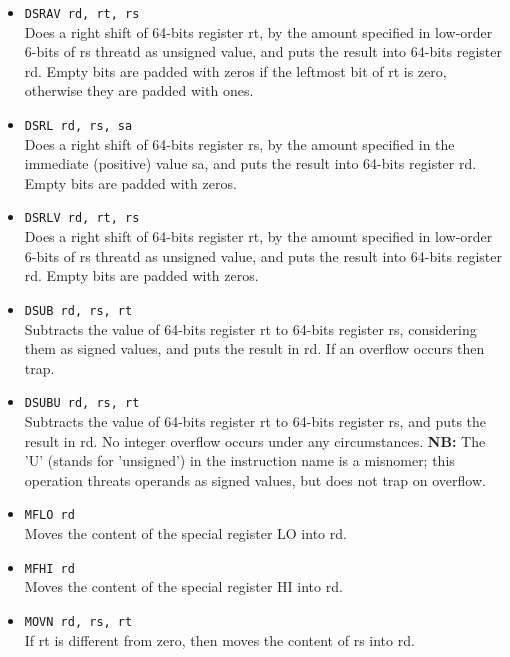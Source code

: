 \documentclass[12pt]{report}
\newcommand{\MISN}{\textbf{NB:} The 'U' (stands for 'unsigned') in the instruction name is a misnomer; 
this operation threats operands as signed values, but does not trap on overflow.}
\begin{document}
\begin{itemize}
	\item \texttt{DSRAV rd, rt, rs}\\
	Does a right shift of 64-bits register rt, by the amount specified in low-order 6-bits of rs threatd as unsigned value,
	and puts the result into 64-bits register rd. Empty bits are padded with zeros if the leftmost bit
	of rt is zero, otherwise they are padded with ones.

	\item \texttt{DSRL rd, rs, sa}\\
	Does a right shift of 64-bits register rs, by the amount specified in the immediate (positive) value sa,
	and puts the result into 64-bits register rd. Empty bits are padded with zeros.
	
	\item \texttt{DSRLV rd, rt, rs}\\
	Does a right shift of 64-bits register rt, by the amount specified in low-order 6-bits of rs threatd as unsigned value,
	and puts the result into 64-bits register rd. Empty bits are padded with zeros.

	\item \texttt{DSUB rd, rs, rt}\\
	Subtracts the value of 64-bits register rt to 64-bits register rs, considering them as signed values,
	and puts the result in rd. If an overflow occurs then trap.

	\item \texttt{DSUBU rd, rs, rt}\\
	Subtracts the value of 64-bits register rt to 64-bits register rs, and puts the result in rd.
	No integer overflow occurs under any circumstances.
	\MISN{}

	\item \texttt{MFLO rd}\\
	Moves the content of the special register LO into rd.

	\item \texttt{MFHI rd}\\
	Moves the content of the special register HI into rd.

	\item \texttt{MOVN rd, rs, rt}\\
	If rt is different from zero, then moves the content of rs into rd.


\end{itemize}
\end{document}

